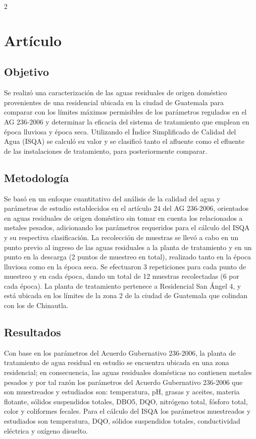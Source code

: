 \documentclass[12pt,spanish,Letterpaper,openany]{book}
\begin{document}
\begin {multicols}{2}
\hypertarget{artuxedculo-4}{%
\section{Artículo}\label{artuxedculo-4}}

\hypertarget{objetivo}{%
\subsection{Objetivo}\label{objetivo}}

Se realizó una caracterización de las aguas residuales de origen doméstico provenientes de una residencial ubicada en la ciudad de Guatemala para comparar con los límites máximos permisibles de los parámetros regulados en el AG 236-2006 y determinar la eficacia del sistema de tratamiento que emplean en época lluviosa y época seca. Utilizando el Índice Simplificado de Calidad del Agua (ISQA) se calculó su valor y se clasificó tanto el afluente como el efluente de las instalaciones de tratamiento, para posteriormente comparar.

\hypertarget{metodologuxeda}{%
\subsection{Metodología}\label{metodologuxeda}}

Se basó en un enfoque cuantitativo del análisis de la calidad del agua y parámetros de estudio establecidos en el artículo 24 del AG 236-2006, orientados en aguas residuales de origen doméstico sin tomar en cuenta los relacionados a metales pesados, adicionando los parámetros requeridos para el cálculo del ISQA y su respectiva clasificación. La recolección de muestras se llevó a cabo en un punto previo al ingreso de las aguas residuales a la planta de tratamiento y en un punto en la descarga (2 puntos de muestreo en total), realizado tanto en la época lluviosa como en la época seca. Se efectuaron 3 repeticiones para cada punto de muestreo y en cada época, dando un total de 12 muestras recolectadas (6 por cada época). La planta de tratamiento pertenece a Residencial San Ángel 4, y está ubicada en los límites de la zona 2 de la ciudad de Guatemala que colindan con los de Chinautla.

\hypertarget{resultados}{%
\subsection{Resultados}\label{resultados}}

Con base en los parámetros del Acuerdo Gubernativo 236-2006, la planta de tratamiento de agua residual en estudio se encuentra ubicada en una zona residencial; en consecuencia, las aguas residuales domésticas no contienen metales pesados y por tal razón los parámetros del Acuerdo Gubernativo 236-2006 que son muestreados y estudiados son: temperatura, pH, grasas y aceites, materia flotante, sólidos suspendidos totales, DBO5, DQO, nitrógeno total, fósforo total, color y coliformes fecales. Para el cálculo del ISQA los parámetros muestreados y estudiados son temperatura, DQO, sólidos suspendidos totales, conductividad eléctrica y oxígeno disuelto.


\end{multicols}
\end{document}
